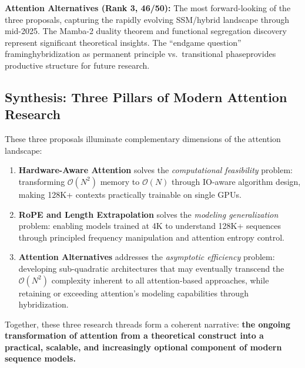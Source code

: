 \documentclass[11pt,a4paper]{article}
\begin{document}
\textbf{Attention Alternatives (Rank 3, 46/50):} The most forward-looking of the three proposals, capturing the rapidly evolving SSM/hybrid landscape through mid-2025. The Mamba-2 duality theorem and functional segregation discovery represent significant theoretical insights. The ``endgame question'' framing\textemdash hybridization as permanent principle vs.\ transitional phase\textemdash provides productive structure for future research.

\subsection{Synthesis: Three Pillars of Modern Attention Research}

These three proposals illuminate complementary dimensions of the attention landscape:

\begin{enumerate}[leftmargin=*]
    \item \textbf{Hardware-Aware Attention} solves the \textit{computational feasibility} problem: transforming $\mathcal{O}(N^2)$ memory to $\mathcal{O}(N)$ through IO-aware algorithm design, making 128K+ contexts practically trainable on single GPUs.
    \item \textbf{RoPE and Length Extrapolation} solves the \textit{modeling generalization} problem: enabling models trained at 4K to understand 128K+ sequences through principled frequency manipulation and attention entropy control.
    \item \textbf{Attention Alternatives} addresses the \textit{asymptotic efficiency} problem: developing sub-quadratic architectures that may eventually transcend the $\mathcal{O}(N^2)$ complexity inherent to all attention-based approaches, while retaining or exceeding attention's modeling capabilities through hybridization.
\end{enumerate}

Together, these three research threads form a coherent narrative: \textbf{the ongoing transformation of attention from a theoretical construct into a practical, scalable, and increasingly optional component of modern sequence models.}
\end{document}
